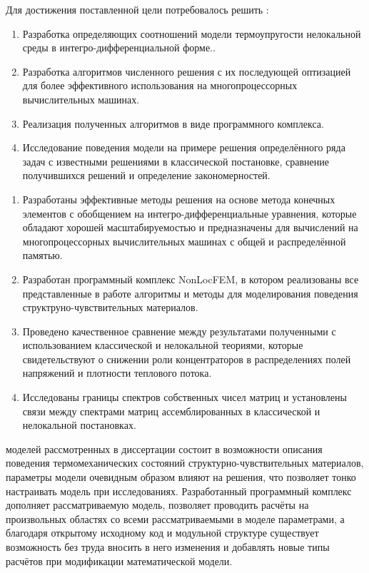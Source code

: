 Для достижения поставленной цели потребовалось решить {\tasks}:
\begin{enumerate}[beginpenalty=10000] %
  \item Разработка определяющих соотношений модели термоупругости нелокальной среды в интегро-дифференциальной форме..
  \item Разработка алгоритмов численного решения с их последующей оптизацией для более эффективного использования на многопроцессорных вычислительных машинах.
  \item Реализация полученных алгоритмов в виде программного комплекса.
  \item Исследование поведения модели на примере решения определённого ряда задач с известными решениями в классической постановке, сравнение получившихся решений и определение закономерностей.
\end{enumerate}


{\novelty}
\begin{enumerate}[beginpenalty=10000] %
  \item Разработаны эффективные методы решения на основе метода конечных элементов с обобщением на интегро-дифференциальные уравнения, которые обладают хорошей масштабируемостью и предназначены для вычислений на многопроцессорных вычислительных машинах с общей и распределённой памятью.
  \item Разработан программный комплекс NonLocFEM, в котором реализованы все представленные в работе алгоритмы и методы для моделирования поведения структруно-чувствительных материалов.
  \item Проведено качественное сравнение между результатами полученными с использованием классической и нелокальной теориями, которые свидетельствуют о снижении роли концентраторов в распределениях полей напряжений и плотности теплового потока.
  \item Исследованы границы спектров собственных чисел матриц и установлены связи между спектрами матриц ассемблированных в классической и нелокальной постановках.
\end{enumerate}

{\influence}
моделей рассмотренных в диссертации состоит в возможности описания поведения термомеханических состояний структурно-чувствительных материалов, параметры модели очевидным образом влияют на решения, что позволяет тонко настраивать модель при исследованиях. Разработанный программный комплекс дополняет рассматриваемую модель, позволяет проводить расчёты на произвольных областях со всеми рассматриваемыми в моделе параметрами, а благодаря открытому исходному код и модульной структуре существует возможность без труда вносить в него изменения и добавлять новые типы расчётов при модификации математической модели.

